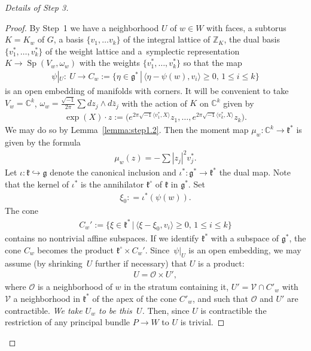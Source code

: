 \documentclass[10pt,a4paper]{amsart}
\numberwithin{equation}{section}
\begin{document}
\begin{proof}[Details of Step 3]
\begin{proof}
By Step~1  we have a
  neighborhood $U$ of $w\in W$ with faces, a subtorus $K=K_w$ of $G$, a basis
  $\{v_1,\ldots v_k\}$ of the integral lattice of ${\mathbb Z}_K$, the dual
  basis $\{v_1^*,\ldots, v_k^*\}$ of the weight lattice and  a~symplectic representation $K\to \operatorname{Sp}(V_w, \omega_w)$ with the weights
  $\{v_1^*,\ldots, v_k^*\}$
  so that the map
\begin{gather*}
\psi|_{U}\colon \ U\to C_w:= \{ \eta \in{\mathfrak g}^* \,|\, \langle \eta - \psi(w),
v_i\rangle \geq 0, \, 1\leq i\leq k\}
\end{gather*}
is an open embedding of manifolds with
corners.
It will be convenient to take $V_w= {\mathbb C}^k$, $\omega_w=
\frac{\sqrt{-1}}{2\pi}\sum dz_j \wedge d\bar{z}_j$ with the  action
of $K$ on ${\mathbb C}^k$ given by
\begin{gather*}
\exp (X)\cdot z:= \big(e^{2\pi \sqrt{-1}\langle v_1^*, X\rangle} z_1, \ldots,
e^{2\pi \sqrt{-1}\langle v_k^*, X\rangle} z_k\big).
\end{gather*}
We may do so by Lemma~\ref{lemma:step1.2}.
Then the moment map $\mu_w\colon {\mathbb C}^k\to {\mathfrak k}^*$ is given by the formula
\begin{gather*}
\mu_w (z) = -\sum |z_j|^2 v_j^*.
\end{gather*}
Let $\iota\colon {\mathfrak k}\hookrightarrow {\mathfrak g}$ denote the canonical inclusion and
$\iota^*\colon  {\mathfrak g}^*\to {\mathfrak k}^*$ the dual map.  Note that the kernel of $\iota^*$
is the annihilator ${\mathfrak k}^\circ $ of ${\mathfrak k}$ in ${\mathfrak g}^*$. Set
\begin{gather*}
\xi_0: = \iota^* (\psi (w)).
\end{gather*}
The cone
\begin{gather*}
C_w':= \big\{ \xi \in{\mathfrak k}^* \,|\, \langle \xi - \xi_0,
v_i\rangle \geq 0, \, 1\leq i\leq k\big\}
\end{gather*}
contains no nontrivial af\/f\/ine subspaces.
If we identify ${\mathfrak k}^*$ with a subspace of ${\mathfrak g}^*$,
the cone $C_w$ becomes the product ${\mathfrak k}^\circ \times C_w'$.
Since~$\psi|_{U}$ is an open embedding, we may assume (by shrinking~$U$
further if necessary) that $U$ is a product:
\begin{gather*}
U= {\mathcal O}\times U',
\end{gather*}
where ${\mathcal O}$ is a neighborhood of $w$ in the stratum containing it,
 $U' = {\mathcal V} \cap C'_w$
with ${\mathcal V}$ a neighborhood in ${\mathfrak k}^*$ of the apex of the cone $C'_w$,
and such that ${\mathcal O}$ and $U'$ are contractible.
{\it We take $U_w$ to be this~$U$.}
 Then, since $U$ is contractible
the restriction of any principal bundle $P\to W$ to $U$ is trivial.


\end{proof}
\end{proof}
\end{document}
